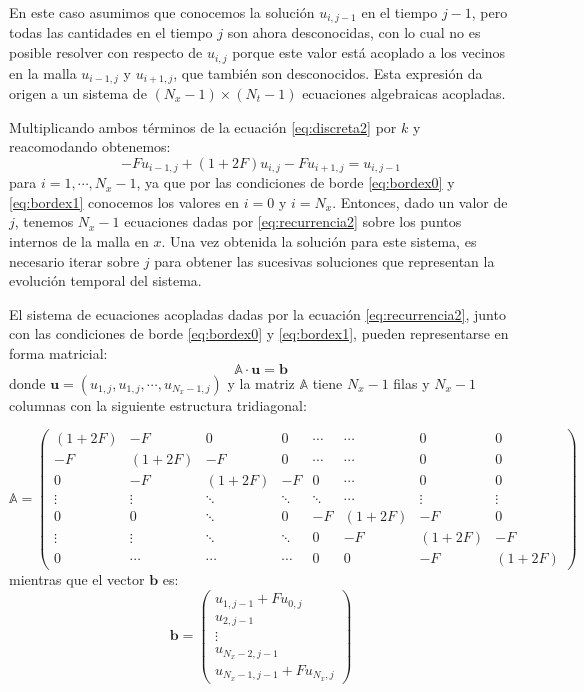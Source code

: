 En este caso asumimos que conocemos la solución $u_{i, j-1}$ en el tiempo $j-1$, pero todas las cantidades en el tiempo $j$ son ahora desconocidas, con lo cual no es posible resolver con respecto de $u_{i,j}$ porque este valor está acoplado a los vecinos en la malla $u_{i-1, j}$ y $u_{i+1,j}$, que también son desconocidos. Esta expresión da origen a un sistema de $(N_x - 1) \times (N_t - 1)$ ecuaciones algebraicas acopladas.

Multiplicando ambos términos de la ecuación \eqref{eq:discreta2} por $k$ y reacomodando obtenemos:
\begin{equation} \label{eq:recurrencia2}
 -F u_{i-1, j} + (1+2F) u_{i,j} - F u_{i+1,j} = u_{i,j-1}
\end{equation} 
para $i = 1, \cdots, N_x - 1$, ya que por las condiciones de borde \eqref{eq:bordex0} y \eqref{eq:bordex1} conocemos los valores en $i=0$ y $i=N_x$. Entonces, dado un valor de $j$, tenemos $N_x-1$ ecuaciones dadas por \eqref{eq:recurrencia2} sobre los puntos internos de la malla en $x$. Una vez obtenida la solución para este sistema, es necesario iterar sobre $j$ para obtener las sucesivas soluciones que representan la evolución temporal del sistema.

El sistema de ecuaciones acopladas dadas por la ecuación \eqref{eq:recurrencia2}, junto con las condiciones de borde \eqref{eq:bordex0} y \eqref{eq:bordex1}, pueden representarse en forma matricial:
\begin{equation} \label{eq:sislin}
 \mathbb{A} \cdot \bm{u} = \bm{b}
\end{equation} 
donde $\bm{u} = (u_{1,j}, u_{1,j}, \cdots, u_{N_x-1,j})$ y la matriz $\mathbb{A}$ tiene $N_x-1$ filas y $N_x-1$ columnas con la siguiente estructura tridiagonal:

\begin{equation*}
 \mathbb{A} = 
 \begin{pmatrix}
  (1+2F) & -F &    0    & 0 & \cdots  & \cdots  &  0  & 0\\
  -F     & (1+2F) & -F & 0  & \cdots   &     \cdots   &  0  & 0 \\
  0      & -F & (1+2F) & -F & 0   & \cdots &  0  & 0 \\   
  \vdots & \vdots & \ddots & \ddots & \ddots & \cdots &  \vdots  & \vdots \\ 
  0      &  0     & \ddots  & 0& -F & (1+2F) & -F & 0 \\
 \vdots  &   \vdots    & \ddots  &  \ddots &  0  &-F & (1+2F) & -F\\
  0      & \cdots& \cdots  &   \cdots & 0     &   0     & -F & (1+2F)
 \end{pmatrix}
 \end{equation*}
mientras que el vector $\bm{b}$ es:
 \begin{equation*}
 \bm{b} =
 \begin{pmatrix}
  u_{1,j-1} + F u_{0,j} \\
  u_{2,j-1} \\
  \vdots \\
  u_{N_x -2,j-1} \\
  u_{N_x -1,j-1} + F u_{N_x, j}
 \end{pmatrix}
 \end{equation*} 

